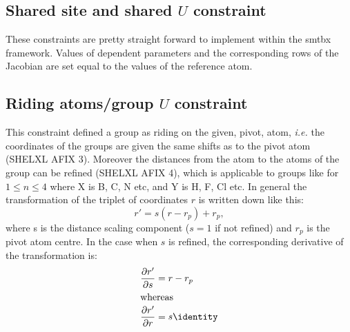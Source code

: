 \documentclass[pdf]{iucr}
\begin{document}
\subsection{Shared site and shared $U$ constraint}
These constraints are pretty straight forward to implement within the smtbx framework. Values of dependent parameters and the corresponding rows of the Jacobian are set equal to the values of the reference atom.

\subsection{Riding atoms/group $U$ constraint}
This constraint defined a group as riding on the given, pivot, atom, \emph{i.e.} the coordinates of the groups are given the same shifts as to the pivot atom (SHELXL AFIX 3). Moreover the distances from the atom to the atoms of the group can be refined (SHELXL AFIX 4), which is applicable to groups like  for $1 \leq n \leq 4$ where X is B, C, N etc, and Y is H, F, Cl etc. In general the transformation of the triplet of coordinates $r$ is written down like this:
\begin{equation}
r' = s(r-r_{p}) + r_{p}, \label{eqn:isometry}
\end{equation}
where s is the distance scaling component ($s=1$ if not refined) and $r_{p}$ is the pivot atom centre. In the case when $s$ is refined, the corresponding derivative of the transformation is:
\begin{align}
\partialder{r'}{s} &= r-r_{p} \\
\shortintertext{whereas}
\partialder{r'}{r} &= s \identity
\end{align}
\end{document}

